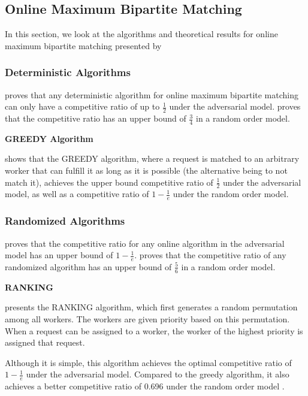\documentclass[urop]{nurop}
\begin{document}
\subsection{Online Maximum Bipartite Matching}
In this section, we look at the algorithms and theoretical results for online maximum bipartite matching presented by \cite{karp,goel}
\subsubsection{Deterministic Algorithms}
\cite{karp} proves that any deterministic algorithm for online maximum bipartite matching can only have a competitive ratio of up to $\frac{1}{2}$ under the adversarial model. \cite{goel} proves that the competitive ratio has an upper bound of $\frac{3}{4}$ in a random order model.

\vspace{2mm} \noindent \textbf{GREEDY Algorithm}

\noindent \cite{karp} shows that the GREEDY algorithm, where a request is matched to an arbitrary worker that can fulfill it as long as it is possible (the alternative being to not match it), achieves the upper bound competitive ratio of $\frac{1}{2}$ under the adversarial model, as well as a competitive ratio of $1 - \frac{1}{e}$ under the random order model.

\subsubsection{Randomized Algorithms}
\cite{karp} proves that the competitive ratio for any online algorithm in the adversarial model has an upper bound of $1 - \frac{1}{e}$.
\cite{goel} proves that the competitive ratio of any randomized algorithm has an upper bound of $\frac{5}{6}$ in a random order model.

\vspace{2mm} \noindent \textbf{RANKING}

\label{ranking}
\noindent \cite{karp} presents the RANKING algorithm, which first generates a random permutation among all workers. The workers are given priority based on this permutation. When a request can be assigned to a worker, the worker of the highest priority is assigned that request.

Although it is simple, this algorithm achieves the optimal competitive ratio of $1 - \frac{1}{e}$ under the adversarial model. Compared to the greedy algorithm, it also achieves a better competitive ratio of 0.696 under the random order model \cite{rankingrandomorder}.
\end{document}
